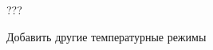 
\begin{DoxyRefList}
\item[Класс \mbox{\hyperlink{class_color_changer}{Color\+Changer}} ]\label{todo__todo000001}%
%
??? 
\item[Класс \mbox{\hyperlink{class_my_dictionary1}{My\+Dictionary1}} ]\label{todo__todo000002}%
%
Добавить другие температурные режимы
\end{DoxyRefList}